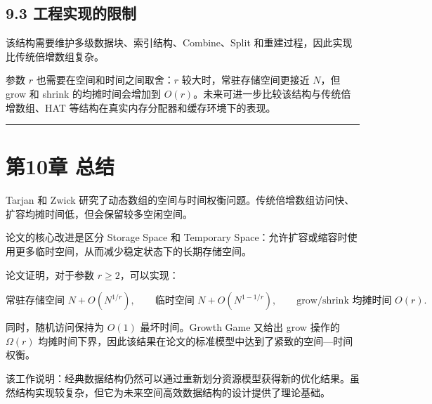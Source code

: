 \documentclass[
  UTF8,
  a4paper,
  12pt]{ctexart}
\begin{document}
\subsection{9.3
工程实现的限制}\label{ux5de5ux7a0bux5b9eux73b0ux7684ux9650ux5236}

该结构需要维护多级数据块、索引结构、Combine、Split
和重建过程，因此实现比传统倍增数组复杂。

参数 \(r\) 也需要在空间和时间之间取舍：\(r\) 较大时，常驻存储空间更接近
\(N\)，但 grow 和 shrink 的均摊时间会增加到
\(O(r)\)。未来可进一步比较该结构与传统倍增数组、HAT
等结构在真实内存分配器和缓存环境下的表现。

\begin{center}\rule{0.5\linewidth}{0.5pt}\end{center}

\section{第10章 总结}\label{ux7b2c10ux7ae0-ux603bux7ed3}

Tarjan 和 Zwick
研究了动态数组的空间与时间权衡问题。传统倍增数组访问快、扩容均摊时间低，但会保留较多空闲空间。

论文的核心改进是区分 Storage Space 和 Temporary
Space：允许扩容或缩容时使用更多临时空间，从而减少稳定状态下的长期存储空间。

论文证明，对于参数 \(r \geq 2\)，可以实现：

\[
\text{常驻存储空间 } N + O(N^{1/r}),\qquad
\text{临时空间 } N + O(N^{1-1/r}),\qquad
\text{grow/shrink 均摊时间 } O(r).
\]

同时，随机访问保持为 \(O(1)\) 最坏时间。Growth Game 又给出 grow 操作的
\(\Omega(r)\)
均摊时间下界，因此该结果在论文的标准模型中达到了紧致的空间---时间权衡。

该工作说明：经典数据结构仍然可以通过重新划分资源模型获得新的优化结果。虽然结构实现较复杂，但它为未来空间高效数据结构的设计提供了理论基础。
\end{document}
